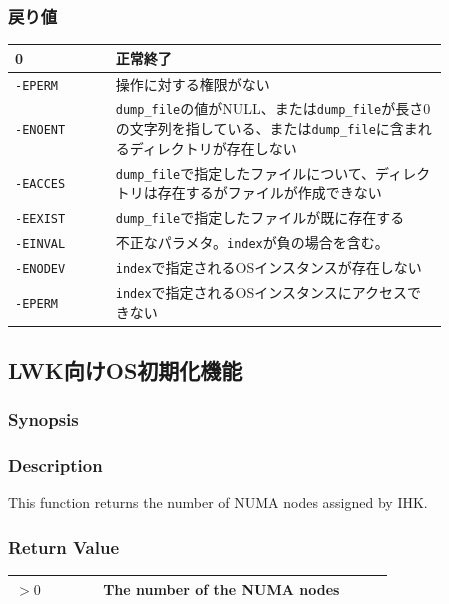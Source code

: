 \documentclass[twoside,11pt,fleqn]{book}
\begin{document}
\subsubsection*{戻り値}{\quad}
\begin{table}[!h]
\footnotesize
\begin{tabular}{|p{0.20\linewidth}|p{0.66\linewidth}|} \hline
0&正常終了\\ \hline
\texttt{-EPERM}&操作に対する権限がない\\ \hline
\texttt{-ENOENT}&\texttt{dump\_file}の値がNULL、または\texttt{dump\_file}が長さ0の文字列を指している、または\texttt{dump\_file}に含まれるディレクトリが存在しない\\ \hline
\texttt{-EACCES}&\texttt{dump\_file}で指定したファイルについて、ディレクトリは存在するがファイルが作成できない\\ \hline
\texttt{-EEXIST}&\texttt{dump\_file}で指定したファイルが既に存在する\\ \hline
\texttt{-EINVAL}&不正なパラメタ。\texttt{index}が負の場合を含む。\\ \hline
\texttt{-ENODEV}&\texttt{index}で指定されるOSインスタンスが存在しない\\ \hline
\texttt{-EPERM}&\texttt{index}で指定されるOSインスタンスにアクセスできない\\ \hline
\end{tabular}
\vspace{-0em}
\end{table}
\FloatBarrier

\subsection{LWK向けOS初期化機能}

\subsubsection{}
\subsubsection*{Synopsis}{\quad}
\subsubsection*{Description}{\quad}
This function returns the number of NUMA nodes assigned by IHK.

\subsubsection*{Return Value}{\quad}
\begin{table}[!h]
\footnotesize
\begin{tabular}{|p{0.20\linewidth}|p{0.66\linewidth}|} \hline
$> 0$&The number of the NUMA nodes\\ \hline
\end{tabular}
\vspace{-0em}
\end{table}
\FloatBarrier
\end{document}
